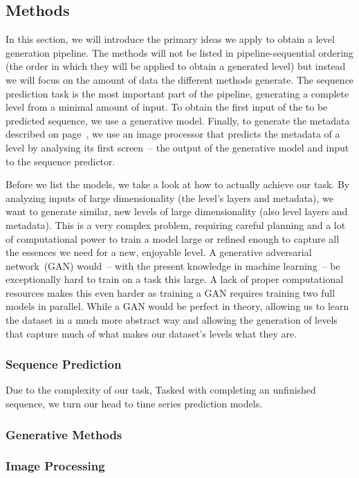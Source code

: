 \subsection{Methods}

In this section, we will introduce the primary ideas we apply to
obtain a level generation pipeline. The methods will not be listed in
pipeline-sequential ordering (the order in which they will be applied
to obtain a generated level) but instead we will focus on the amount
of data the different methods generate. The sequence prediction task
is the most important part of the pipeline, generating a complete
level from a minimal amount of input. To obtain the first input of the
to be predicted sequence, we use a generative model. Finally, to
generate the metadata described on page~\pageref{par:metadata}, we use
an image processor that predicts the metadata of a level by analysing
its first screen~-- the output of the generative model and input to
the sequence predictor.

Before we list the models, we take a look at how to actually achieve
our task. By analyzing inputs of large dimensionality (the level's
layers and metadata), we want to generate similar, new levels of large
dimensionality (also level layers and metadata). This is a very
complex problem, requiring careful planning and a lot of computational
power to train a model large or refined enough to capture all the
essences we need for a new, enjoyable level. A generative adversarial
network~(GAN) would~-- with the present knowledge in machine
learning~-- be exceptionally hard to train on a task this large. A
lack of proper computational resources makes this even harder as
training a GAN requires training two full models in parallel. While a
GAN would be perfect in theory, allowing us to learn the dataset in a
much more abstract way and allowing the generation of levels that
capture much of what makes our dataset's levels what they are.


\subsubsection{Sequence Prediction}

Due to the complexity of our task,
Tasked with completing an unfinished sequence, we turn our head to
time series prediction models.


\subsubsection{Generative Methods}



\subsubsection{Image Processing}




